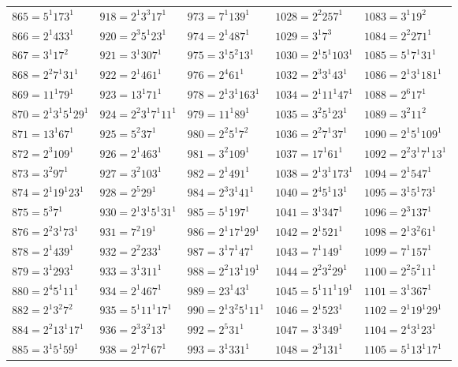 {\begin{longtable}[c]{*{5}{l}}
$865=5^{1}173^{1}$&$918=2^{1}3^{3}17^{1}$&$973=7^{1}139^{1}$&$1028=2^{2}257^{1}$&$1083=3^{1}19^{2}$\\
$866=2^{1}433^{1}$&$920=2^{3}5^{1}23^{1}$&$974=2^{1}487^{1}$&$1029=3^{1}7^{3}$&$1084=2^{2}271^{1}$\\
$867=3^{1}17^{2}$&$921=3^{1}307^{1}$&$975=3^{1}5^{2}13^{1}$&$1030=2^{1}5^{1}103^{1}$&$1085=5^{1}7^{1}31^{1}$\\
$868=2^{2}7^{1}31^{1}$&$922=2^{1}461^{1}$&$976=2^{4}61^{1}$&$1032=2^{3}3^{1}43^{1}$&$1086=2^{1}3^{1}181^{1}$\\
$869=11^{1}79^{1}$&$923=13^{1}71^{1}$&$978=2^{1}3^{1}163^{1}$&$1034=2^{1}11^{1}47^{1}$&$1088=2^{6}17^{1}$\\
$870=2^{1}3^{1}5^{1}29^{1}$&$924=2^{2}3^{1}7^{1}11^{1}$&$979=11^{1}89^{1}$&$1035=3^{2}5^{1}23^{1}$&$1089=3^{2}11^{2}$\\
$871=13^{1}67^{1}$&$925=5^{2}37^{1}$&$980=2^{2}5^{1}7^{2}$&$1036=2^{2}7^{1}37^{1}$&$1090=2^{1}5^{1}109^{1}$\\
$872=2^{3}109^{1}$&$926=2^{1}463^{1}$&$981=3^{2}109^{1}$&$1037=17^{1}61^{1}$&$1092=2^{2}3^{1}7^{1}13^{1}$\\
$873=3^{2}97^{1}$&$927=3^{2}103^{1}$&$982=2^{1}491^{1}$&$1038=2^{1}3^{1}173^{1}$&$1094=2^{1}547^{1}$\\
$874=2^{1}19^{1}23^{1}$&$928=2^{5}29^{1}$&$984=2^{3}3^{1}41^{1}$&$1040=2^{4}5^{1}13^{1}$&$1095=3^{1}5^{1}73^{1}$\\
$875=5^{3}7^{1}$&$930=2^{1}3^{1}5^{1}31^{1}$&$985=5^{1}197^{1}$&$1041=3^{1}347^{1}$&$1096=2^{3}137^{1}$\\
$876=2^{2}3^{1}73^{1}$&$931=7^{2}19^{1}$&$986=2^{1}17^{1}29^{1}$&$1042=2^{1}521^{1}$&$1098=2^{1}3^{2}61^{1}$\\
$878=2^{1}439^{1}$&$932=2^{2}233^{1}$&$987=3^{1}7^{1}47^{1}$&$1043=7^{1}149^{1}$&$1099=7^{1}157^{1}$\\
$879=3^{1}293^{1}$&$933=3^{1}311^{1}$&$988=2^{2}13^{1}19^{1}$&$1044=2^{2}3^{2}29^{1}$&$1100=2^{2}5^{2}11^{1}$\\
$880=2^{4}5^{1}11^{1}$&$934=2^{1}467^{1}$&$989=23^{1}43^{1}$&$1045=5^{1}11^{1}19^{1}$&$1101=3^{1}367^{1}$\\
$882=2^{1}3^{2}7^{2}$&$935=5^{1}11^{1}17^{1}$&$990=2^{1}3^{2}5^{1}11^{1}$&$1046=2^{1}523^{1}$&$1102=2^{1}19^{1}29^{1}$\\
$884=2^{2}13^{1}17^{1}$&$936=2^{3}3^{2}13^{1}$&$992=2^{5}31^{1}$&$1047=3^{1}349^{1}$&$1104=2^{4}3^{1}23^{1}$\\
$885=3^{1}5^{1}59^{1}$&$938=2^{1}7^{1}67^{1}$&$993=3^{1}331^{1}$&$1048=2^{3}131^{1}$&$1105=5^{1}13^{1}17^{1}$\\

\end{longtable}}
